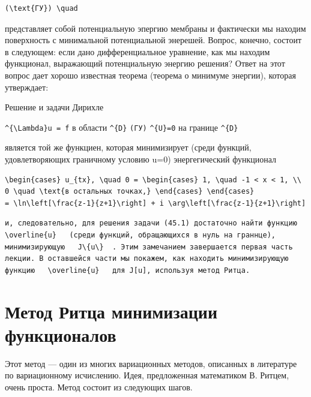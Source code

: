 \documentclass[
  ukrainian,
]{article}
\begin{document}
\begin{verbatim}
(\text{ГУ}) \quad
\end{verbatim}

представляет собой потенциальную эпергию мембраны и фактически мы
находим поверхность с минимальной потенциальной энерешей. Вопрос,
конечно, состоит в следующем: если дано дифференциальное уравнение, как
мы находим функционал, выражающий потенциальную энергию решения? Ответ
на этот вопрос дает хорошо известная теорема (теорема о минимуме
энергии), которая утверждает:

Решение и задачи Дирихле

\texttt{\^{}\{\textbackslash{}Lambda\}u\ =\ f} в области
\texttt{\^{}\{D\}} \texttt{(ГУ)} \texttt{\^{}\{U\}=0} на границе
\texttt{\^{}\{D\}}

является той же функциен, которая минимизирует (среди функций,
удовлетворяющих граничному условию u=0) энергегический функционал

\begin{verbatim}
\begin{cases} u_{tx}, \quad 0 = \begin{cases} 1, \quad -1 < x < 1, \\ 0 \quad \text{в остальных точках,} \end{cases} \end{cases}
= \ln\left[\frac{z-1}{z+1}\right] + i \arg\left[\frac{z-1}{z+1}\right]
\end{verbatim}

\begin{verbatim}
и, следовательно, для решения задачи (45.1) достаточно найти функцию   \overline{u}   (среди функций, обращающихся в нуль на граннце), минимизирующую   J\{u\}  . Этим замечанием завершается первая часть лекции. В оставшейся части мы покажем, как находить минимизирующую функцию   \overline{u}   для J[u], используя метод Ритца.
\end{verbatim}

\section{Метод Ритца минимизации
функционалов}\label{ux43cux435ux442ux43eux434-ux440ux438ux442ux446ux430-ux43cux438ux43dux438ux43cux438ux437ux430ux446ux438ux438-ux444ux443ux43dux43aux446ux438ux43eux43dux430ux43bux43eux432}

Этот метод --- один из многих вариационных методов, описанных в
литературе по вариационному исчислению. Идея, предложенная математиком
В. Ритцем, очень проста. Метод состоит из следующих шагов.
\end{document}
